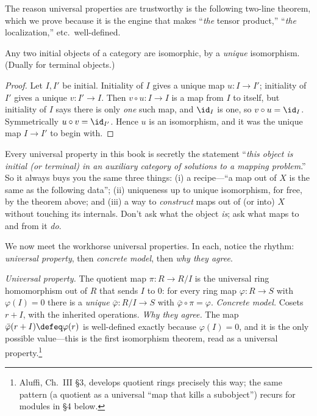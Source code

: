 \documentclass[11pt]{article}
\begin{document}
The reason universal properties are trustworthy is the following two-line theorem, which we
prove because it is the engine that makes ``\emph{the} tensor product,'' ``\emph{the}
localization,'' etc.\ well-defined.

\begin{ttheorem}
Any two initial objects of a category are isomorphic, by a \emph{unique} isomorphism. (Dually
for terminal objects.)
\end{ttheorem}

\begin{proof}
Let $I,I'$ be initial. Initiality of $I$ gives a unique map $u\colon I\to I'$; initiality of
$I'$ gives a unique $v\colon I'\to I$. Then $v\circ u\colon I\to I$ is a map from $I$ to
itself, but initiality of $I$ says there is only \emph{one} such map, and $\id_I$ is one, so
$v\circ u=\id_I$. Symmetrically $u\circ v=\id_{I'}$. Hence $u$ is an isomorphism, and it was
the unique map $I\to I'$ to begin with.
\end{proof}

\begin{ttechnique}
Every universal property in this book is secretly the statement ``\emph{this object is
initial (or terminal) in an auxiliary category of solutions to a mapping problem}.'' So it
always buys you the same three things: (i) a recipe---``a map out of $X$ is the same as the
following data''; (ii) uniqueness up to unique isomorphism, for free, by the theorem above;
and (iii) a way to \emph{construct} maps out of (or into) $X$ without touching its internals.
Don't ask what the object \emph{is}; ask what maps to and from it \emph{do}.
\end{ttechnique}

We now meet the workhorse universal properties. In each, notice the rhythm: \emph{universal
property}, then \emph{concrete model}, then \emph{why they agree}.

\begin{eexample}
\emph{Universal property.} The quotient map $\pi\colon R\to R/I$ is the universal ring
homomorphism out of $R$ that sends $I$ to $0$: for every ring map $\varphi\colon R\to S$ with
$\varphi(I)=0$ there is a \emph{unique} $\bar\varphi\colon R/I\to S$ with
$\bar\varphi\circ\pi=\varphi$. \emph{Concrete model.} Cosets $r+I$, with the inherited
operations. \emph{Why they agree.} The map $\bar\varphi(r+I)\defeq\varphi(r)$ is
well-defined exactly because $\varphi(I)=0$, and it is the only possible value---this is the
first isomorphism theorem, read as a universal property.\footnote{Aluffi, Ch.~III \S3,
develops quotient rings precisely this way; the same pattern (a quotient as a universal
``map that kills a subobject'') recurs for modules in \S4 below.}
\end{eexample}
\end{document}
